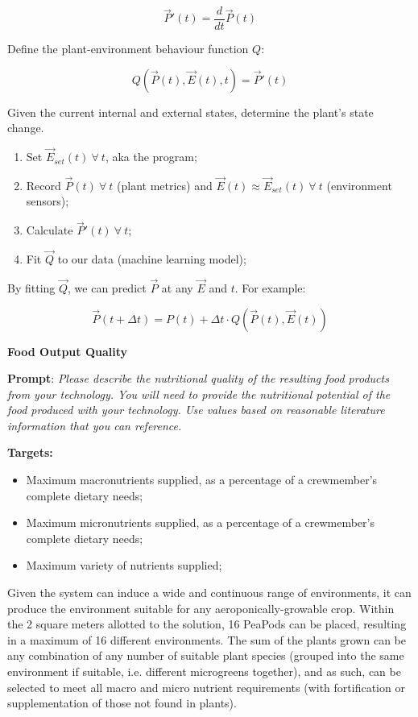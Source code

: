 \documentclass{report}
\begin{document}
$$\vec P'(t) = \frac{d}{dt}\vec P(t)$$

Define the plant-environment behaviour function $Q$: 

$$Q(\vec P(t), \vec E(t), t)=\vec P'(t)$$ 

Given the current internal and external states, determine the plant's state change.

\begin{enumerate}
    \item Set $\vec E_{set}(t)~\forall~ t$, aka the program;
    \item Record $\vec P(t)~\forall~ t$ (plant metrics) and $\vec E(t)\approx \vec E_{set}(t)~\forall~ t$ (environment sensors);
    \item Calculate $\vec P'(t)~\forall~ t$;
    \item Fit $\vec Q$ to our data (machine learning model);
\end{enumerate}

By fitting $\vec Q$, we can predict $\vec P$ at any $\vec E$ and $t$. For example:

$$\vec P(t+\Delta t)=P(t)+\Delta t\cdot Q(\vec P(t),\vec E(t))$$

\textbf{Food Output Quality}
\label{sec:resource-outputquality}

\textbf{Prompt}: \textit{Please describe  the nutritional quality of the resulting food products from your technology. You will need to provide the nutritional potential of the food produced with your technology. Use values based on reasonable literature information that you can reference.}

\textbf{Targets:}
\begin{itemize}
    \item Maximum macronutrients supplied, as a percentage of a crewmember’s complete dietary needs;
    \item Maximum micronutrients supplied, as a percentage of a crewmember’s complete dietary needs;
    \item Maximum variety of nutrients supplied;
\end{itemize}


Given the system can induce a wide and continuous range of environments, it can produce the environment suitable for any aeroponically-growable crop. Within the 2 square meters allotted to the solution, 16 PeaPods can be placed, resulting in a maximum of 16 different environments. The sum of the plants grown can be any combination of any number of suitable plant species (grouped into the same environment if suitable, i.e. different microgreens together), and as such, can be selected to meet all macro and micro nutrient requirements (with fortification or supplementation of those not found in plants). 
\end{document}
